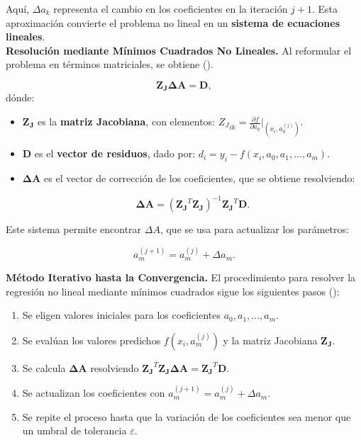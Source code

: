 \documentclass{article}
\begin{document}
Aquí, $\Delta a_k$ representa el cambio en los coeficientes en la iteración $j+1$. Esta aproximación convierte el problema no lineal en un \textbf{sistema de ecuaciones lineales}.\\

\noindent \textbf{Resolución mediante Mínimos Cuadrados No Lineales.} Al reformular el problema en términos matriciales, se obtiene (\cite{nolineal1}).

\begin{equation}
    \mathbf{Z_J} \mathbf{\Delta A} = \mathbf{D},
\end{equation}
dónde:
\begin{itemize}
    \item $\mathbf{Z_J}$ es la \textbf{matriz Jacobiana}, con elementos:
    $
        {Z_J}_{ik} = \frac{\partial f}{\partial a_k} \bigg|_{(x_i, a_k^{(j)})}.
    $

    \item $\mathbf{D}$ es el \textbf{vector de residuos}, dado por:
    $
        d_i = y_i - f(x_i, a_0, a_1, \dots, a_m).
    $

    \item $\mathbf{\Delta A}$ es el vector de corrección de los coeficientes, que se obtiene resolviendo:

    \begin{equation}
        \mathbf{\Delta A} = (\mathbf{Z_J}^T \mathbf{Z_J})^{-1} \mathbf{Z_J}^T \mathbf{D}.
    \end{equation}
\end{itemize}
Este sistema permite encontrar $\Delta A$, que se usa para actualizar los parámetros:

\begin{equation}
    a_m^{(j+1)} = a_m^{(j)} + \Delta a_m.
\end{equation}

\noindent \textbf{Método Iterativo hasta la Convergencia.} El procedimiento para resolver la regresión no lineal mediante mínimos cuadrados sigue los siguientes pasos (\cite{nolineal2}):

\begin{enumerate}
    \item Se eligen valores iniciales para los coeficientes $a_0, a_1, \dots, a_m$.
    \item Se evalúan los valores predichos $f(x_i, a_m^{(j)})$ y la matriz Jacobiana $\mathbf{Z_J}$.
    \item Se calcula $\mathbf{\Delta A}$ resolviendo $\mathbf{Z_J}^T \mathbf{Z_J} \mathbf{\Delta A} = \mathbf{Z_J}^T \mathbf{D}$.
    \item Se actualizan los coeficientes con $a_m^{(j+1)} = a_m^{(j)} + \Delta a_m$.
    \item Se repite el proceso hasta que la variación de los coeficientes sea menor que un umbral de tolerancia $\varepsilon$.
\end{enumerate}
\end{document}

